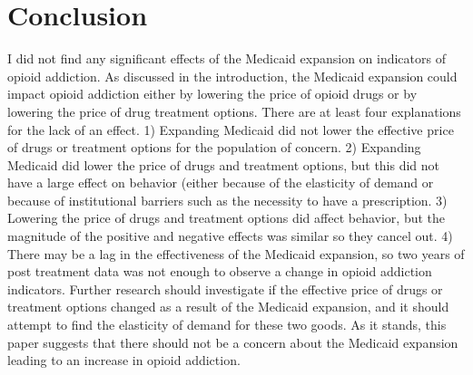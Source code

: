 \documentclass[11pt]{article}
\begin{document}
\section{Conclusion}

I did not find any significant effects of the Medicaid expansion on indicators of opioid addiction.  As discussed in the introduction, the Medicaid expansion could impact opioid addiction either by lowering the price of opioid drugs or by lowering the price of drug treatment options.  There are at least four explanations for the lack of an effect.  1) Expanding Medicaid did not lower the effective price of drugs or treatment options for the population of concern.  2)  Expanding Medicaid did lower the price of drugs and treatment options, but this did not have a large effect on behavior (either because of the elasticity of demand or because of institutional barriers such as the necessity to have a prescription.  3)  Lowering the price of drugs and treatment options did affect behavior, but the magnitude of the positive and negative effects was similar so they cancel out.  4)  There may be a lag in the effectiveness of the Medicaid expansion, so two years of post treatment data was not enough to observe a change in opioid addiction indicators.  Further research should investigate if the effective price of drugs or treatment options changed as a result of the Medicaid expansion, and it should attempt to find the elasticity of demand for these two goods.  As it stands, this paper suggests that there should not be a concern about the Medicaid expansion leading to an increase in opioid addiction. 

\cleardoublepage



\end{document}
